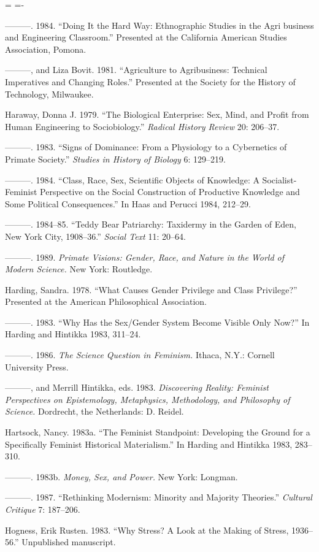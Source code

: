 \documentclass[DIV=12,%
               BCOR=10mm,%
               headinclude=false,%
               footinclude=false,open=any,%
               fontsize=11pt,%
               twoside,%
               paper=210mm:11in]%
               {scrbook}
\newenvironment*{amusebiblio}{
  \leftskip=\parindent
  \parindent=-\parindent
  \smallskip
  \indent
}{\smallskip}
\newcommand*{\Slash}{\slash\hspace{0pt}}
\begin{document}
\begin{amusebiblio}
———. 1984. “Doing It the Hard Way: Ethnographic Studies in the Agri business and Engineering Classroom.” Presented at the California American Studies Association, Pomona.


———, and Liza Bovit. 1981. “Agriculture to Agribusiness: Technical Imperatives and Changing Roles.” Presented at the Society for the History of Technology, Milwaukee.


Haraway, Donna J. 1979. “The Biological Enterprise: Sex, Mind, and Profit from Human Engineering to Sociobiology.” \emph{Radical History Review} 20: 206–37.


———. 1983. “Signs of Dominance: From a Physiology to a Cybernetics of Primate Society.” \emph{Studies in History of Biology} 6: 129–219.


———. 1984. “Class, Race, Sex, Scientific Objects of Knowledge: A Socialist-Feminist Perspective on the Social Construction of Productive Knowledge and Some Political Consequences.” In Haas and Perucci 1984, 212–29.


———. 1984–85. “Teddy Bear Patriarchy: Taxidermy in the Garden of Eden, New York City, 1908–36.” \emph{Social Text} 11: 20–64.


———. 1989. \emph{Primate Visions: Gender, Race, and Nature in the World of Modern Science.} New York: Routledge.


Harding, Sandra. 1978. “What Causes Gender Privilege and Class Privilege?” Presented at the American Philosophical Association.


———. 1983. “Why Has the Sex\Slash{}Gender System Become Visible Only Now?” In Harding and Hintikka 1983, 311–24.


———. 1986. \emph{The Science Question in Feminism.} Ithaca, N.Y.: Cornell University Press.


———, and Merrill Hintikka, eds. 1983. \emph{Discovering Reality: Feminist Perspectives on Epistemology, Metaphysics, Methodology, and Philosophy of Science.} Dordrecht, the Netherlands: D. Reidel.


Hartsock, Nancy. 1983a. “The Feminist Standpoint: Developing the Ground for a Specifically Feminist Historical Materialism.” In Harding and Hintikka 1983, 283–310.


———. 1983b. \emph{Money, Sex, and Power.} New York: Longman.


———. 1987. “Rethinking Modernism: Minority and Majority Theories.” \emph{Cultural Critique} 7: 187–206.


Hogness, Erik Rusten. 1983. “Why Stress? A Look at the Making of Stress, 1936–56.” Unpublished manuscript.



\end{amusebiblio}
\end{document}
